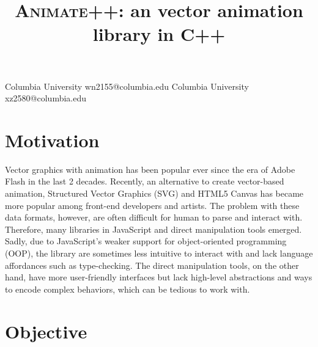 \documentclass[10pt, nocopyrightspace, numbers]{assets/sigplanconf}
\begin{document}
\title{\textsc{Animate++}: an vector animation library in C++}



           {Columbia University}
           {wn2155@columbia.edu}
           {Columbia University}
           {xz2580@columbia.edu}
\maketitle





\section{Motivation}

Vector graphics with animation has been popular ever since the era of Adobe Flash in the last 2 decades. Recently, an alternative to create vector-based animation,  Structured Vector Graphics (SVG) and HTML5 Canvas has became more popular among front-end developers and artists. The problem with these data formats, however, are often difficult for human to parse and interact with. Therefore, many libraries in JavaScript\cite{paperjs, snapsvg} and direct manipulation tools\cite{svgator} emerged. Sadly, due to JavaScript’s weaker support for object-oriented programming (OOP), the library are sometimes less intuitive to interact with and lack language affordances such as type-checking. The direct manipulation tools, on the other hand, have more user-friendly interfaces but lack high-level abstractions and ways to encode complex behaviors, which can be tedious to work with.

\section{Objective}
\end{document}
